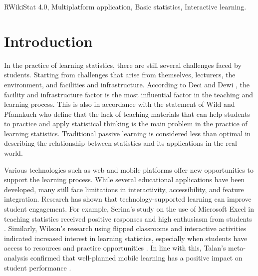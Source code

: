 \documentclass[conference,a4paper]{IEEEtran}
\begin{document}
\begin{IEEEkeywords}
  RWikiStat 4.0, Multiplatform application, Basic statistics, Interactive learning.
\end{IEEEkeywords}

\section{Introduction}
\label{sect:introduction}

In the practice of learning statistics, there are still several challenges faced by students. Starting from challenges that arise from themselves, lecturers, the environment, and facilities and infrastructure. According to Deci and Dewi \cite{b1}, the facility and infrastructure factor is the most influential factor in the teaching and learning process. This is also in accordance with the statement of Wild and Pfannkuch \cite{b2} who define that the lack of teaching materials that can help students to practice and apply statistical thinking is the main problem in the practice of learning statistics. Traditional passive learning is considered less than optimal in describing the relationship between statistics and its applications in the real world.

Various technologies such as web and mobile platforms offer new opportunities to support the learning process. While several educational applications have been developed, many still face limitations in interactivity, accessibility, and feature integration. Research has shown that technology-supported learning can improve student engagement. For example, Serina's study on the use of Microsoft Excel in teaching statistics received positive responses and high enthusiasm from students \cite{b3}. Similarly, Wilson's research using flipped classrooms and interactive activities indicated increased interest in learning statistics, especially when students have access to resources and practice opportunities \cite{b4}. In line with this, Talan's meta-analysis confirmed that well-planned mobile learning has a positive impact on student performance \cite{b5}.
\end{document}
